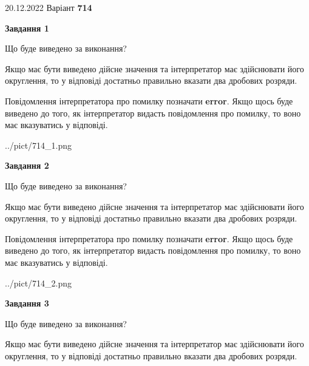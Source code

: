 \documentclass[12pt, ukrainian]{article}
\begin{document}
{20.12.2022 Варіант \No \textbf { 714 }\par}
{
\begin {Large}

{\begin {center}\textbf{Завдання 1}\end {center}}\par
Що буде виведено за виконання? \par

Якщо має бути виведено дійсне значення та інтерпретатор має здійснювати його округлення, 
то у відповіді достатньо правильно вказати два дробових розряди.

Повідомлення інтерпретатора про помилку позначати \textbf{error}.
Якщо щось буде виведено до того, як інтерпретатор видасть повідомлення про помилку, 
то воно має вказуватись у відповіді. \par

\begin{center}
	{../pict/714_1.png}
\end{center}
\newpage

{\begin {center}\textbf{Завдання 2}\end {center}}\par
Що буде виведено за виконання? \par

Якщо має бути виведено дійсне значення та інтерпретатор має здійснювати його округлення, 
то у відповіді достатньо правильно вказати два дробових розряди.

Повідомлення інтерпретатора про помилку позначати \textbf{error}.
Якщо щось буде виведено до того, як інтерпретатор видасть повідомлення про помилку, 
то воно має вказуватись у відповіді. \par

\begin{center}
	{../pict/714_2.png}
\end{center}
\newpage

{\begin {center}\textbf{Завдання 3}\end {center}}\par
Що буде виведено за виконання? \par

Якщо має бути виведено дійсне значення та інтерпретатор має здійснювати його округлення, 
то у відповіді достатньо правильно вказати два дробових розряди.


\end{Large}}
\end{document}
